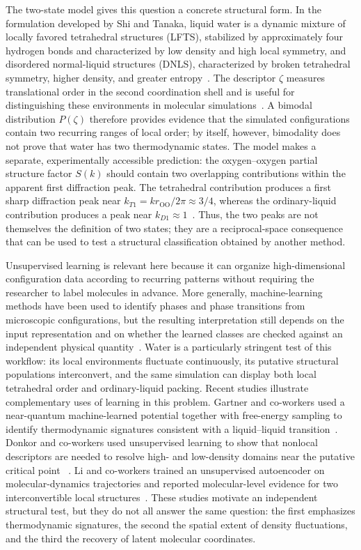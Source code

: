 \documentclass[aps, amsmath,amssymb, reprint, twocolumn, superscriptaddress]{revtex4-2}
\begin{document}
The two-state model gives this question a concrete structural form. In the
formulation developed by Shi and Tanaka, liquid water is a dynamic mixture of
locally favored tetrahedral structures (LFTS), stabilized by approximately four
hydrogen bonds and characterized by low density and high local symmetry, and
disordered normal-liquid structures (DNLS), characterized by broken tetrahedral
symmetry, higher density, and greater entropy~\cite{russo_understanding_2014,shi_microscopic_2018}.
The descriptor $\zeta$ measures translational order in the second coordination
shell and is useful for distinguishing these environments in molecular
simulations~\cite{russo_understanding_2014}. A bimodal distribution $P(\zeta)$
therefore provides evidence that the simulated configurations contain two
recurring ranges of local order; by itself, however, bimodality does not prove
that water has two thermodynamic states. The model makes a separate,
experimentally accessible prediction: the oxygen--oxygen partial structure
factor $S(k)$ should contain two overlapping contributions within the apparent
first diffraction peak. The tetrahedral contribution produces a first sharp
diffraction peak near $k_{T1}=kr_{\mathrm{OO}}/2\pi\approx 3/4$, whereas the
ordinary-liquid contribution produces a peak near $k_{D1}\approx 1$~\cite{shi_direct_2020,shi-2019}.
Thus, the two peaks are not themselves the definition of two states; they are a
reciprocal-space consequence that can be used to test a structural
classification obtained by another method.

Unsupervised learning is relevant here because it can organize high-dimensional
configuration data according to recurring patterns without requiring the
researcher to label molecules in advance. More generally, machine-learning
methods have been used to identify phases and phase transitions from microscopic
configurations, but the resulting interpretation still depends on the input
representation and on whether the learned classes are checked against an
independent physical quantity~\cite{carrasquilla_machine_2017}. Water is a
particularly stringent test of this workflow: its local environments fluctuate
continuously, its putative structural populations interconvert, and the same
simulation can display both local tetrahedral order and ordinary-liquid packing.
Recent studies illustrate complementary uses of learning in this problem.
Gartner and co-workers used a near-quantum machine-learned potential together
with free-energy sampling to identify thermodynamic signatures consistent with
a liquid--liquid transition~\cite{gartner_signatures_2020}. Donkor and co-workers
used unsupervised learning to show that nonlocal descriptors are needed to
resolve high- and low-density domains near the putative critical point
~\cite{donkor_beyond_2024}. Li and co-workers trained an unsupervised autoencoder
on molecular-dynamics trajectories and reported molecular-level evidence for
two interconvertible local structures~\cite{li_evidence_2026}. These studies
motivate an independent structural test, but they do not all answer the same
question: the first emphasizes thermodynamic signatures, the second the spatial
extent of density fluctuations, and the third the recovery of latent molecular
coordinates.
\end{document}

